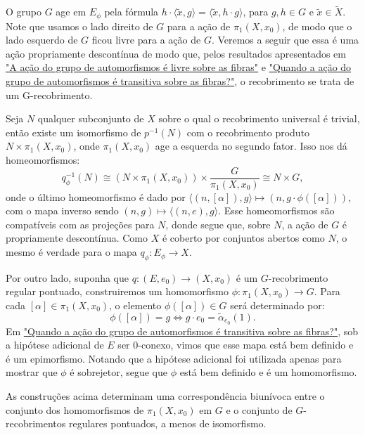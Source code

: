 O grupo $G$ age em $E_{\phi}$ pela fórmula $h \cdot \langle \tilde x, g \rangle = \langle \tilde x, h \cdot g \rangle$, para $g, h \in G$ e $\tilde x \in \tilde X$. Note que usamos o lado direito de $G$ para a ação de $\pi_1(X, x_0)$, de modo que o lado esquerdo de $G$ ficou livre para a ação de $G$. Veremos a seguir que essa é uma ação propriamente descontínua de modo que, pelos resultados apresentados em \hyperref[acao-de-automorfismos-e-livre-prop]{"A ação do grupo de automorfismos é livre sobre as fibras"} e \hyperref[acao-de-automorfismo-transitiva-prop]{"Quando a ação do grupo de automorfismos é transitiva sobre as fibras?"}, o recobrimento se trata de um G-recobrimento.

Seja $N$ qualquer subconjunto de $X$ sobre o qual o recobrimento universal é trivial, então existe um isomorfismo de $p^{-1}(N)$ com o recobrimento produto $N \times \pi_1(X, x_0)$, onde $\pi_1(X, x_0)$ age a esquerda no segundo fator. Isso nos dá homeomorfismos: $$q_{\phi}^{-1}(N) \cong (N \times \pi_1(X, x_0)) \times \frac{G}{\pi_1(X, x_0)} \cong N \times G,$$ onde o último homeomorfismo é dado por $\langle (n, [\alpha]), g \rangle \mapsto (n, g \cdot \phi([\alpha]))$, com o mapa inverso sendo $(n, g) \mapsto \langle (n, e), g \rangle$. Esse homeomorfismos são compatíveis com as projeções para $N$, donde segue que, sobre $N$, a ação de $G$ é propriamente descontínua. Como $X$ é coberto por conjuntos abertos como $N$, o mesmo é verdade para o mapa $q_{\phi}:E_{\phi} \longrightarrow X$.

Por outro lado, suponha que $q: (E, e_0) \longrightarrow (X, x_0)$ é um $G$-recobrimento regular pontuado, construiremos um homomorfismo $\phi:\pi_1(X, x_0) \longrightarrow G$. Para cada $[\alpha] \in \pi_1(X, x_0)$, o elemento $\phi([\alpha]) \in G$ será determinado por: $$\phi([\alpha]) = g \Longleftrightarrow g \cdot e_0 = \tilde \alpha_{e_0}(1).$$ Em \hyperref[acao-de-automorfismo-transitiva-prop]{"Quando a ação do grupo de automorfismos é transitiva sobre as fibras?"}, sob a hipótese adicional de $E$ ser $0$-conexo, vimos que esse mapa está bem definido e é um epimorfismo. Notando que a hipótese adicional foi utilizada apenas para mostrar que $\phi$ é sobrejetor, segue que $\phi$ está bem definido e é um homomorfismo.

\begin{thm}
	As construções acima determinam uma correspondência biunívoca entre o conjunto dos homomorfismos de $\pi_1(X, x_0)$ em $G$ e o conjunto de $G$-recobrimentos regulares pontuados, a menos de isomorfismo.
\end{thm}

